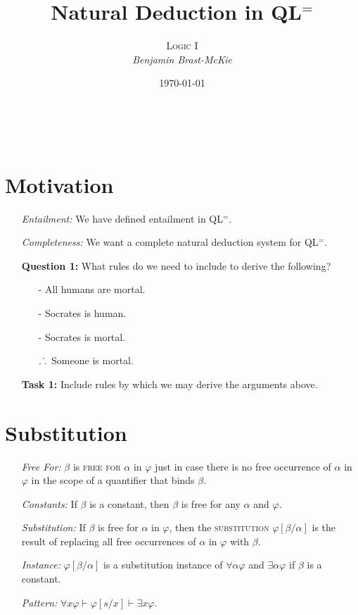 \documentclass[a4paper, 11pt]{article} %
\title{\textbf{Natural Deduction in QL$^=$}} %
\author{\textsc{Logic I}\\ \em Benjamin Brast-McKie} %
\date{\today} %
\makeatletter
\def\therefore{\ensuremath{\ldotp\dot\,\ldotp}}
\newcommand{\qt}[2]{#1 #2} %
\newcommand{\unisub}[2]{[#1/#2]}
\renewcommand{\maketitle}{ %
\begin{flushright} %
{\LARGE\@title} %

\vspace{10pt} %

{\@author} %
\\\@date %

\vspace{40pt} %
\end{flushright}
}
\makeatother
\begin{document}
\maketitle %

\thispagestyle{empty}




\section*{Motivation}

\begin{enumerate}
  \item[\it Entailment:] We have defined entailment in QL$^=$.
  \item[\it Completeness:] We want a complete natural deduction system for QL$^=$.
  \item[\bf Question 1:] What rules do we need to include to derive the following?
    \begin{itemize}
      \item[-] All humans are mortal.
      \item[-] Socrates is human.
      \item[-] Socrates is mortal.
      \item[$\therefore$] Someone is mortal.
    \end{itemize}
  \item[\bf Task 1:] Include rules by which we may derive the arguments above. 
\end{enumerate}




\section*{Substitution}

\begin{enumerate}
  \item[\it Free For:] $\beta$ is \textsc{free for} $\alpha$ in $\varphi$ just in case there is no free occurrence of $\alpha$ in $\varphi$ in the scope of a quantifier that binds $\beta$. 
  \item[\it Constants:] If $\beta$ is a constant, then $\beta$ is free for any $\alpha$ and $\varphi$. 
  \item[\it Substitution:] If $\beta$ is free for $\alpha$ in $\varphi$, then the \textsc{substitution} $\varphi\unisub{\beta}{\alpha}$ is the result of replacing all free occurrences of $\alpha$ in $\varphi$ with $\beta$. 
  \item[\it Instance:] $\varphi\unisub{\beta}{\alpha}$ is a substitution instance of $\qt{\forall}{\alpha}\varphi$ and $\qt{\exists}{\alpha}\varphi$ if $\beta$ is a constant. 
  \item[\it Pattern:] $\qt{\forall}{x}\varphi \vdash \varphi\unisub{s}{x} \vdash \qt{\exists}{x}\varphi$.
\end{enumerate}
   
\end{document}
